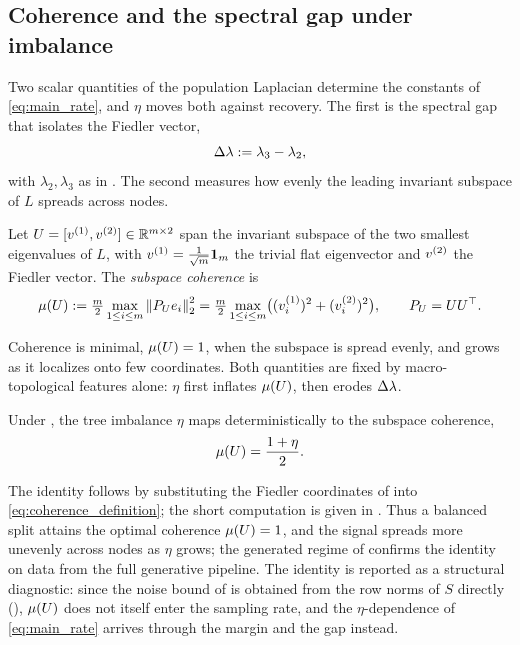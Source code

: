 \subsection{Coherence and the spectral gap under imbalance}\label{sec:bridging-scaling}

Two scalar quantities of the population Laplacian determine the constants of
\eqref{eq:main_rate}, and $\eta$ moves both against recovery. The first is the
spectral gap that isolates the Fiedler vector,
\begin{equation}\label{eq:gap_definition}
   \Delta\lambda := \lambda_3 - \lambda_2 ,
\end{equation}
with $\lambda_2,\lambda_3$ as in . The second measures how evenly
the leading invariant subspace of $L$ spreads across nodes.

\begin{definition}\label{def:coherence}
Let $U=[v^{(1)},v^{(2)}]\in\mathbb{R}^{m\times2}$ span the invariant subspace of the two
smallest eigenvalues of $L$, with $v^{(1)}=\tfrac1{\sqrt m}\mathbf{1}_m$ the trivial flat
eigenvector and $v^{(2)}$ the Fiedler vector. The \emph{subspace coherence} is
\begin{equation}\label{eq:coherence_definition}
   \mu(U) := \tfrac{m}{2}\max_{1\le i\le m}\left\lVert P_U e_i \right\rVert_2^2
         = \tfrac{m}{2}\max_{1\le i\le m}\bigl((v_i^{(1)})^2+(v^{(2)}_i)^2\bigr),
   \qquad P_U=UU^\top.
\end{equation}
\end{definition}

\noindent Coherence is minimal, $\mu(U)=1$, when the subspace is spread evenly, and
grows as it localizes onto few coordinates. Both quantities are fixed by
 macro-topological features alone: $\eta$ first inflates $\mu(U)$, then erodes $\Delta\lambda$.

\begin{proposition}\label{prop:coherence}
Under , the tree imbalance $\eta$ maps deterministically to the
subspace coherence,
\begin{equation}\label{eq:coherence_linear_growth}
   \mu(U)=\frac{1+\eta}{2}.
\end{equation}
\end{proposition}
\noindent The identity follows by substituting the Fiedler coordinates of
 into \eqref{eq:coherence_definition}; the short computation is given in
. Thus a balanced split attains the
optimal coherence $\mu(U)=1$, and the signal spreads more unevenly across nodes as
$\eta$ grows; the generated regime of  confirms the identity
on data from the full generative pipeline. The identity is reported as a
structural diagnostic: since the noise bound of  is obtained
from the row norms of $S$ directly (), $\mu(U)$ does not itself enter
the sampling rate, and the $\eta$-dependence of \eqref{eq:main_rate} arrives
through the margin and the gap instead.


